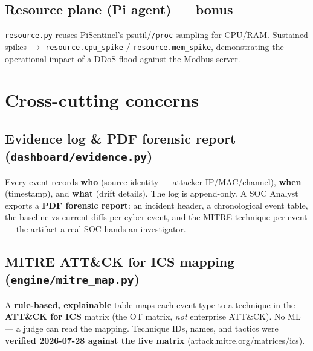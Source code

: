 \documentclass[11pt,a4paper]{article}
\newcommand{\code}[1]{\texttt{\small #1}}
\begin{document}
\subsection{Resource plane (Pi agent) --- bonus}
\code{resource.py} reuses PiSentinel's psutil/\code{/proc} sampling for CPU/RAM. Sustained spikes
$\rightarrow$ \code{resource.cpu\_spike} / \code{resource.mem\_spike}, demonstrating the operational
impact of a DDoS flood against the Modbus server.

\section{Cross-cutting concerns}

\subsection{Evidence log \& PDF forensic report (\texttt{dashboard/evidence.py})}
Every event records \textbf{who} (source identity --- attacker IP/MAC/channel), \textbf{when}
(timestamp), and \textbf{what} (drift details). The log is append-only. A SOC Analyst exports a
\textbf{PDF forensic report}: an incident header, a chronological event table, the baseline-vs-current
diffs per cyber event, and the MITRE technique per event --- the artifact a real SOC hands an investigator.

\subsection{MITRE ATT\&CK for ICS mapping (\texttt{engine/mitre\_map.py})}
A \textbf{rule-based, explainable} table maps each event type to a technique in the \textbf{ATT\&CK for
ICS} matrix (the OT matrix, \emph{not} enterprise ATT\&CK). No ML --- a judge can read the mapping.
Technique IDs, names, and tactics were \textbf{verified 2026-07-28 against the live matrix}
(attack.mitre.org/matrices/ics).
\end{document}
